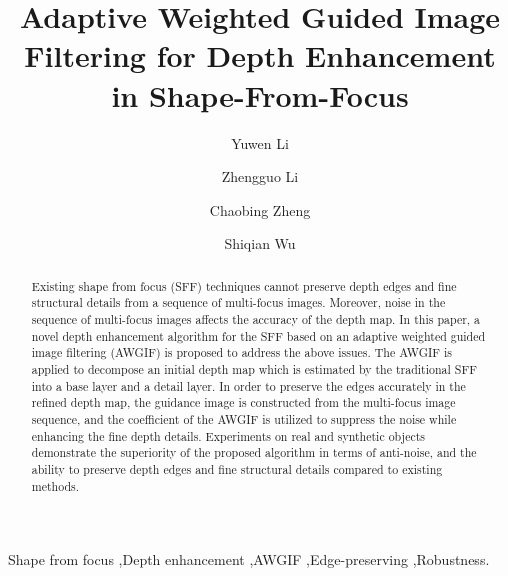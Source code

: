 \documentclass[a4paper,fleqn]{cas-dc}
\begin{document}
\let\WriteBookmarks\relax
\def\floatpagepagefraction{1}
\def\textpagefraction{.001}

\pagestyle{plain}	



\title[mode = title]{Adaptive Weighted Guided Image Filtering for Depth Enhancement in Shape-From-Focus}



\author[1,4]{Yuwen Li}
\author[2]{Zhengguo Li}
\author[3]{Chaobing Zheng}
\author[3]{Shiqian Wu}
\cormark[1] 

\address[1]{Hubei Key Laboratory of Mechanical Transmission and Manufacturing Engineering, Wuhan University of Science and Technology, Wuhan 430081, China}
\address[2]{SRO Department, Institute for Infocomm Research, 138632, Singapore}
\address[3]{Institute of Robotics and Intelligent Systems, School of Information Science and Engineering, Wuhan University of Science and Technology, Wuhan 430081, China}
\address[4]{School of Electrical Engineering, Nanchang Institute of Technology, Nanchang 330099, China}


\begin{abstract}
Existing shape from focus (SFF) techniques cannot preserve depth edges and fine structural details from a sequence of multi-focus images. Moreover, noise in the sequence of multi-focus images affects the accuracy of the depth map. In this paper, a novel depth enhancement algorithm for the SFF based on an adaptive weighted guided image filtering (AWGIF) is proposed to address the above issues. The AWGIF is applied to decompose an initial depth map which is estimated by the traditional SFF into a base layer and a detail layer. In order to preserve the edges accurately in the refined depth map, the guidance image is constructed from the multi-focus image sequence, and the coefficient of the AWGIF is utilized to suppress the noise while enhancing the fine depth details. Experiments on real and synthetic objects demonstrate the superiority of the proposed algorithm in terms of anti-noise, and the ability to preserve depth edges and fine structural details compared to existing methods.
\end{abstract}





\begin{keywords}
 Shape from focus \sep Depth enhancement \sep AWGIF \sep Edge-preserving \sep Robustness.  
\end{keywords}
\end{document}
